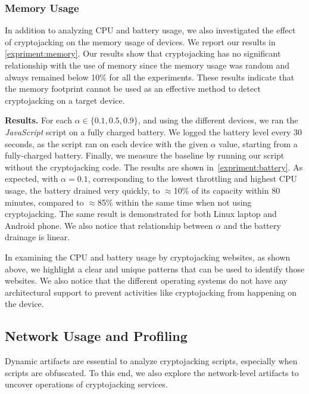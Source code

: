 \documentclass[acmlarge]{acmart}
\newcommand{\BfPara}[1]{{\noindent\bf#1.}\xspace\xspace}
\newcommand{\js}{{\em JavaScript}\xspace}
\newcommand{\cj}{cryptojacking\xspace}
\begin{document}
{\color{black}\subsubsection{Memory Usage} In addition to analyzing CPU and battery usage, we also investigated the effect of \cj on the memory usage of devices. We report our results in \autoref{expriment:memory}. Our results show that \cj has no significant relationship with the use of memory since the memory usage was random and always remained below 10\% for all the experiments. These results indicate that the memory footprint cannot be used as an effective method to detect \cj on a target device.}



\BfPara{Results} For each $\alpha\in \{0.1, 0.5, 0.9\}$, and using the different devices, we ran the \js script on a fully charged battery. We logged the battery level every 30 seconds, as the script ran on each device with the given $\alpha$ value, starting from a fully-charged battery. Finally, we measure the baseline by running our script without the \cj code. The results are shown in~\autoref{expriment:battery}. As expected, with $\alpha=0.1$, corresponding to the lowest throttling and highest CPU usage, the battery drained very quickly, to $\approx$10\% of its capacity within 80 minutes, compared to $\approx$85\% within the same time when not using \cj. The same result is demonstrated for both Linux laptop and Android phone. We also notice that relationship between $\alpha$ and the battery drainage is linear.



In examining the CPU and battery usage by \cj websites, as shown above, we highlight a clear and unique patterns that can be used to identify those websites. We also notice that the different operating systems do not have any architectural  support to prevent activities like \cj from happening on the device. 





\subsection{Network Usage and Profiling} \label{sec:throt}
Dynamic artifacts are essential to analyze \cj scripts, especially when scripts are obfuscated. To this end, we also explore the network-level artifacts to uncover operations of \cj services. 
\end{document}

